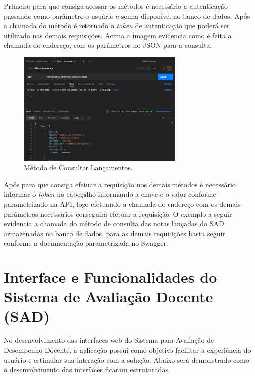     Primeiro para que consiga acessar os métodos é necessário a autenticação passando como parâmetro o usuário e senha disponível no banco de dados. Após a chamada do método é retornado o \textit{token} de autenticação que poderá ser utilizado nas demais requisições. Acima a imagem evidencia como é feita a chamada do endereço, com os parâmetros no JSON para a consulta.
    
    \begin{figure}[h]
    \centering
    \includegraphics[width=0.72\textwidth]{./img/ApiLancamento.png}
    \caption{Método de Consultar Lançamentos.}
    \label{fig:ApiLancamento}
    \end{figure}

    Após para que consiga efetuar a requisição nos demais métodos é necessário informar o \textit{token} no cabeçalho informando a chave e o valor conforme parametrizado na API, logo efetuando a chamada do endereço com os demais parâmetros necessários conseguirá  efetuar a requisição. O exemplo a seguir evidencia a chamada do método de consulta das notas lançadas do SAD armazenadas no banco de dados, para as demais requisições basta seguir conforme a documentação parametrizada no Swagger.
    
\section{Interface e Funcionalidades do Sistema de Avaliação Docente (SAD)}
    
    No desenvolvimento das interfaces web do Sistema para Avaliação de Desempenho Docente, a aplicação possui como objetivo facilitar a experiência do usuário e estimular sua interação com a solução. Abaixo será demonstrado como o desenvolvimento das interfaces ficaram estruturadas.
    
